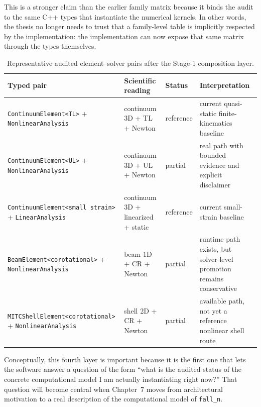 This is a stronger claim than the earlier family matrix because it binds the
audit to the same C++ types that instantiate the numerical kernels.  In other
words, the thesis no longer needs to trust that a family-level table is
implicitly respected by the implementation: the implementation can now expose
that same matrix through the types themselves.

\begin{table}[htbp]
  \centering
  \caption{Representative audited element--solver pairs after the Stage-1
  composition layer.}
  \label{tab:stage1-element-solver-audit}
  \small
  \begin{tabular}{@{}llll@{}}
    \toprule
    \textbf{Typed pair} & \textbf{Scientific reading} & \textbf{Status} &
    \textbf{Interpretation} \\
    \midrule
    \texttt{ContinuumElement<TL>} + \texttt{NonlinearAnalysis}
    & continuum 3D + TL + Newton
    & reference
    & current quasi-static finite-kinematics baseline \\

    \texttt{ContinuumElement<UL>} + \texttt{NonlinearAnalysis}
    & continuum 3D + UL + Newton
    & partial
    & real path with bounded evidence and explicit disclaimer \\

    \texttt{ContinuumElement<small strain>} + \texttt{LinearAnalysis}
    & continuum 3D + linearized + static
    & reference
    & current small-strain baseline \\

    \texttt{BeamElement<corotational>} + \texttt{NonlinearAnalysis}
    & beam 1D + CR + Newton
    & partial
    & runtime path exists, but solver-level promotion remains conservative \\

    \texttt{MITCShellElement<corotational>} + \texttt{NonlinearAnalysis}
    & shell 2D + CR + Newton
    & partial
    & available path, not yet a reference nonlinear shell route \\
    \bottomrule
  \end{tabular}
\end{table}

Conceptually, this fourth layer is important because it is the first one that
lets the software answer a question of the form ``what is the audited status of
the concrete computational model I am actually instantiating right now?''  That
question will become central when Chapter~7 moves from architectural
motivation to a real description of the computational model of
\texttt{fall\_n}.


